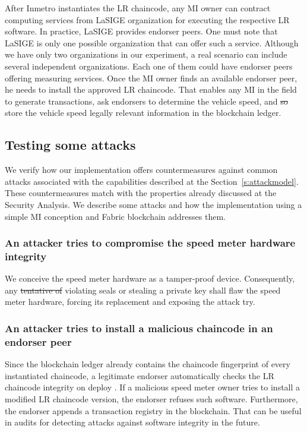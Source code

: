 \documentclass[journal]{IEEEtran}
\providecommand{\DIFadd}[1]{{\protect\color{blue}\uwave{#1}}} %
\providecommand{\DIFdel}[1]{{\protect\color{red}\sout{#1}}}                      %
\providecommand{\DIFaddbegin}{} %
\providecommand{\DIFaddend}{} %
\providecommand{\DIFdelbegin}{} %
\providecommand{\DIFdelend}{} %
\begin{document}
After Inmetro instantiates the LR chaincode, any MI owner can contract computing services from \DIFaddbegin \DIFadd{the }\DIFaddend LaSIGE organization for executing the respective LR software.
In practice, LaSIGE provides endorser peers.
One must note that LaSIGE is only one possible organization that can offer such a service.
Although we have only two organizations in our experiment, a real scenario can include several independent organizations.
Each one of them could have endorser peers offering measuring services.
Once the MI owner finds an available endorser peer, he needs to install the approved LR chaincode.
That enables any MI in the field to generate transactions, ask endorsers to determine the vehicle speed, and \DIFdelbegin \DIFdel{so }\DIFdelend \DIFaddbegin \DIFadd{therefore }\DIFaddend store the vehicle speed legally relevant information in the blockchain ledger.

\subsection{Testing some attacks}
We verify how our implementation offers countermeasures against common attacks associated with the capabilities described at the Section~\ref{s:attackmodel}.
These countermeasures match with the properties already discussed at the Security Analysis.
We describe some attacks and how the implementation using a simple MI conception and Fabric blockchain addresses them.

\subsubsection{An attacker tries to compromise the speed meter hardware integrity}
We conceive the speed meter hardware as a tamper-proof device.
Consequently, any \DIFdelbegin \DIFdel{tentative of }\DIFdelend \DIFaddbegin \DIFadd{attempt at }\DIFaddend violating seals or stealing a private key shall flaw the speed meter hardware, forcing its replacement and exposing the attack try.

\subsubsection{An attacker tries to install a malicious chaincode in an endorser peer}
Since the blockchain ledger already contains the chaincode fingerprint of every instantiated chaincode, a legitimate endorser automatically checks the LR chaincode integrity on deploy \DIFaddbegin \DIFadd{time}\DIFaddend .
If a malicious speed meter owner tries to install a modified LR chaincode version, the endorser refuses such software.
Furthermore, the endorser appends a transaction registry in the blockchain.
That can be useful in audits for detecting attacks against software integrity in the future.
\end{document}
